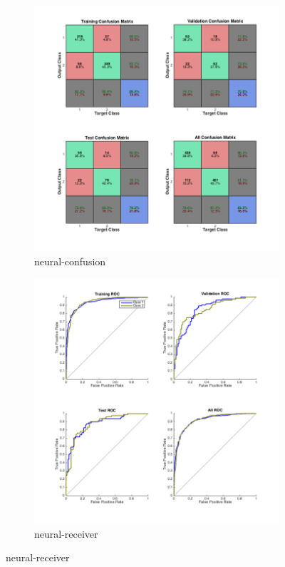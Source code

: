 \documentclass[]{article}
\begin{document}
\begin{figure}[h]
	\begin{subfigure}{.49\textwidth}
		\centering
		\includegraphics[width=1\linewidth]{../images-update/1-(4)-neural_confusion.png}
		\caption{neural-confusion}
		\label{fig:sub1}
	\end{subfigure}	
	\begin{subfigure}{.49\textwidth}
		\centering
		\includegraphics[width=1\linewidth]{../images-update/1-(4)-neural_receiver.png}
		\caption{neural-receiver}
		\label{fig:sub1}
	\end{subfigure}
	

\end{figure}
\end{document}
